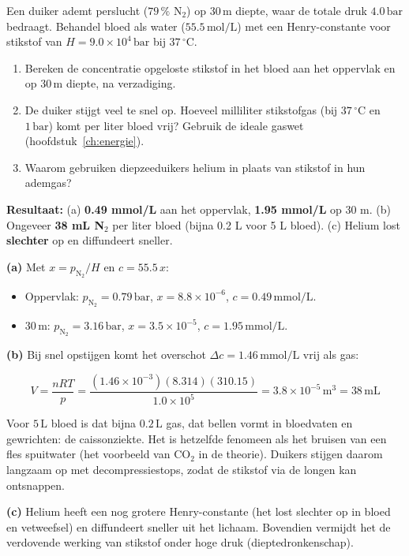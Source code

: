 \begin{oefening}
Een duiker ademt perslucht (\(79\,\%\) \(\mathrm{N_2}\)) op \(30\,\mathrm{m}\) diepte, waar de totale druk \(4.0\,\mathrm{bar}\) bedraagt. Behandel bloed als water (\(55.5\,\mathrm{mol/L}\)) met een Henry-constante voor stikstof van \(H = 9.0\times10^{4}\,\mathrm{bar}\) bij \(37\,^\circ\mathrm{C}\).

\begin{enumerate}
\item[(a)]
  Bereken de concentratie opgeloste stikstof in het bloed aan het oppervlak en op \(30\,\mathrm{m}\) diepte, na verzadiging.
\item[(b)]
  De duiker stijgt veel te snel op. Hoeveel milliliter stikstofgas (bij \(37\,^\circ\mathrm{C}\) en \(1\,\mathrm{bar}\)) komt per liter bloed vrij? Gebruik de ideale gaswet (hoofdstuk~\ref{ch:energie}).
\item[(c)]
  Waarom gebruiken diepzeeduikers helium in plaats van stikstof in hun ademgas?
\end{enumerate}
\end{oefening}
\begin{oplossing}
\textbf{Resultaat:} (a) \textbf{0.49 mmol/L} aan het oppervlak, \textbf{1.95 mmol/L} op 30 m. (b) Ongeveer \textbf{38 mL N\ensuremath{_{2}}} per liter bloed (bijna 0.2 L voor 5 L bloed). (c) Helium lost \textbf{slechter} op en diffundeert sneller.

\textbf{(a)} Met \(x = p_{\mathrm{N_2}}/H\) en \(c = 55.5\,x\):

\begin{itemize}
\item
  Oppervlak: \(p_{\mathrm{N_2}} = 0.79\,\mathrm{bar}\), \(x = 8.8\times10^{-6}\), \(c = 0.49\,\mathrm{mmol/L}\).
\item
  \(30\,\mathrm{m}\): \(p_{\mathrm{N_2}} = 3.16\,\mathrm{bar}\), \(x = 3.5\times10^{-5}\), \(c = 1.95\,\mathrm{mmol/L}\).
\end{itemize}

\textbf{(b)} Bij snel opstijgen komt het overschot \(\Delta c = 1.46\,\mathrm{mmol/L}\) vrij als gas:

\[
V = \frac{nRT}{p} = \frac{(1.46\times10^{-3})(8.314)(310.15)}{1.0\times10^{5}} = 3.8\times10^{-5}\,\mathrm{m^3} = 38\,\mathrm{mL}
\]

Voor \(5\,\mathrm{L}\) bloed is dat bijna \(0.2\,\mathrm{L}\) gas, dat bellen vormt in bloedvaten en gewrichten: de caissonziekte. Het is hetzelfde fenomeen als het bruisen van een fles spuitwater (het voorbeeld van \(\mathrm{CO_2}\) in de theorie). Duikers stijgen daarom langzaam op met decompressiestops, zodat de stikstof via de longen kan ontsnappen.

\textbf{(c)} Helium heeft een nog grotere Henry-constante (het lost slechter op in bloed en vetweefsel) en diffundeert sneller uit het lichaam. Bovendien vermijdt het de verdovende werking van stikstof onder hoge druk (dieptedronkenschap).
\end{oplossing}

